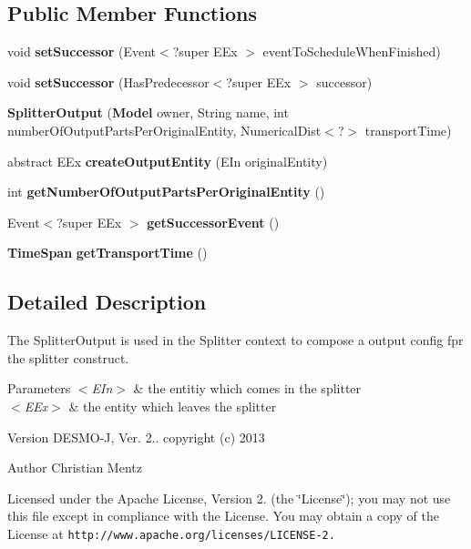 \subsection*{Public Member Functions}
\begin{DoxyCompactItemize}
\item 
void {\bfseries set\-Successor} (Event$<$?super E\-Ex $>$ event\-To\-Schedule\-When\-Finished)\label{classdesmoj_1_1extensions_1_1chaining_1_1_splitter_output_3_01_e_in_01extends_01_entity_00_01_e_ex_01extends_01_entity_01_4_a2818982e1ea4c7129d5074bc618719a4}

\item 
void {\bfseries set\-Successor} (Has\-Predecessor$<$?super E\-Ex $>$ successor)\label{classdesmoj_1_1extensions_1_1chaining_1_1_splitter_output_3_01_e_in_01extends_01_entity_00_01_e_ex_01extends_01_entity_01_4_ada245438b0a47d99b2ce8ae7fe6bc8d2}

\item 
{\bf Splitter\-Output} ({\bf Model} owner, String name, int number\-Of\-Output\-Parts\-Per\-Original\-Entity, Numerical\-Dist$<$?$>$ transport\-Time)
\item 
abstract E\-Ex {\bf create\-Output\-Entity} (E\-In original\-Entity)
\item 
int {\bf get\-Number\-Of\-Output\-Parts\-Per\-Original\-Entity} ()
\item 
Event$<$?super E\-Ex $>$ {\bf get\-Successor\-Event} ()
\item 
{\bf Time\-Span} {\bf get\-Transport\-Time} ()
\end{DoxyCompactItemize}


\subsection{Detailed Description}
The Splitter\-Output is used in the Splitter context to compose a output config fpr the splitter construct.


\begin{DoxyParams}{Parameters}
{\em $<$\-E\-In$>$} & the entitiy which comes in the splitter \\
\hline
{\em $<$\-E\-Ex$>$} & the entity which leaves the splitter\\
\hline
\end{DoxyParams}
\begin{DoxyVersion}{Version}
D\-E\-S\-M\-O-\/\-J, Ver. 2.. copyright (c) 2013 
\end{DoxyVersion}
\begin{DoxyAuthor}{Author}
Christian Mentz
\end{DoxyAuthor}
Licensed under the Apache License, Version 2. (the \char`\"{}\-License\char`\"{}); you may not use this file except in compliance with the License. You may obtain a copy of the License at {\tt http\-://www.\-apache.\-org/licenses/\-L\-I\-C\-E\-N\-S\-E-\/2.}

